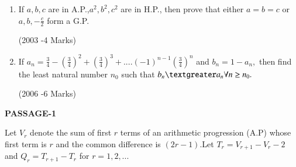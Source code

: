\documentclass[journal,12pt,twocolumn]{IEEEtran}
\theoremstyle{remark}
\begin{document}
\begin{enumerate}
	\item If $a,b,c$ are in A.P.,$a^{2},b^{2},c^{2} $ are in H.P., then prove that either $ a=b=c $ or $a,b,-\frac{c}{2}$ form a G.P. 
		                    
                      \hfill(2003 -4 Marks)                             

		\item If $ a_n=\frac{3}{4}-(\frac{3}{4})^{2}+(\frac{3}{4})^{3}+....(-1)^{n-1}(\frac{3}{4})^{n} $ and $ b_{n}=1-a_{n}, $ then find the least natural number $n_{0}$ such that $ b_{n} \textgreater a_{n} \forall n \geq n_{0}. $ 
		             
                             \hfill(2006 -6 Marks)                             
 \end{enumerate} 


    \begin{center}    
      \textbf{PASSAGE-1}
    \end{center}
 Let $ V_{r} $ denote the sum of first $r$ terms of an arithmetic progression (A.P) whose first term is $r$ and the common difference is $(2r-1)$.Let $ T_{r}=V_{r+1}-V_{r}-2 $ and $ Q_{r}=T_{r+1}-T_{r}$ for $r=1,2,...$
 \\ 
\end{document}
